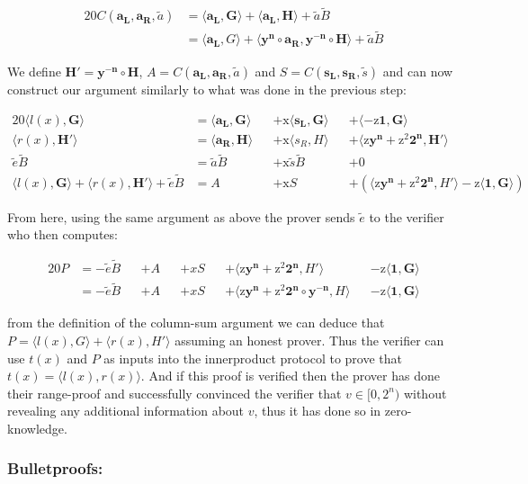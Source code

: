 \documentclass{article}
\newcommand{\eq}[1]{\begin{alignat*}{20}#1\end{alignat*}}
\renewcommand{\vec}[1]{\boldsymbol{#1}}
\newcommand{\ran}[1]{\mathrm{#1}}
\newcommand{\vecran}[1]{\mathbf{#1}}
\newcommand{\dotp}[2]{\langle #1, #2 \rangle}
\begin{document}
\eq{
	C(\vec{a_L}, \vec{a_R}, \widetilde{a}) &= \dotp{\vec{a_L}}{\vec{G}} + \dotp{\vec{a_L}}{\vec{H}} + \widetilde{a}\widetilde{B} \\
	&= \dotp{\vec{a_L}}{G} + \dotp{\vecran{y^n}\circ \vec{a_R}}{\vecran{y^{-n}}\circ \vec{H}} + \widetilde{a}\widetilde{B}
}

We define $\vec{H'} = \vecran{y^{-n}}\circ\vec{H}$, $A = C(\vec{a_L},\vec{a_R}, \widetilde{a})$ and $S = C(\vec{s_L}, \vec{s_R}, \widetilde{s})$ and can now construct our argument similarly to what was done in the previous step:

\eq{
	\dotp{l(x)}{\vec{G}} &= \dotp{\vec{a_L}}{\vec{G}} &&+ \ran{x}\dotp{\vec{s_L}}{\vec{G}} &&+ \dotp{-\ran{z}\vec{1}}{\vec{G}} \\
	\dotp{r(x)}{\vec{H'}} &= \dotp{\vec{a_R}}{\vec{H}} &&+ \ran{x}\dotp{s_R}{H} &&+ \dotp{\ran{z}\vecran{y^n} + \ran{z^2}\vec{2^n}}{\vec{H'}}\\
	\widetilde{e}\widetilde{B} &= \widetilde{a}\widetilde{B} &&+ \ran{x}\widetilde{s}\widetilde{B} &&+ 0 \\
	\dotp{l(x)}{\vec{G}} + \dotp{r(x)}{\vec{H'}} + \widetilde{e}\widetilde{B} &= A &&+ \ran{x}S &&+ (\dotp{\ran{z}\vecran{y^n} + \ran{z^2}\vec{2^n}}{H'} - \ran{z}\dotp{\vec{1}}{\vec{G}})
}

From here, using the same argument as above the prover sends $\widetilde{e}$ to the verifier who then computes:

\eq{
	P &= -\widetilde{e}\widetilde{B} &&+ A &&+ xS &&+ \dotp{\ran{z}\vecran{y^n} + \ran{z^2}\vec{2^n}}{H'} &&- \ran{z}\dotp{\vec{1}}{\vec{G}} \\
	&= -\widetilde{e}\widetilde{B} &&+ A &&+ xS &&+ \dotp{\ran{z}\vecran{y^n} + \ran{z^2}\vec{2^n}\circ\vecran{y^{-n}}}{H} &&- \ran{z}\dotp{\vec{1}}{\vec{G}}
}

from the definition of the column-sum argument we can deduce that $P = \dotp{l(x)}{G} + \dotp{r(x)}{H'}$ assuming an honest prover. Thus the verifier can use $t(x)$ and $P$ as inputs into the innerproduct protocol to prove that $ t(x) = \dotp{l(x)}{r(x)}$. And if this proof is verified then the prover has done their range-proof and successfully convinced the verifier that $v\in [0,2^n)$ without revealing any additional information about $v$, thus it has done so in zero-knowledge.

\subsubsection{Bulletproofs:}
\end{document}
